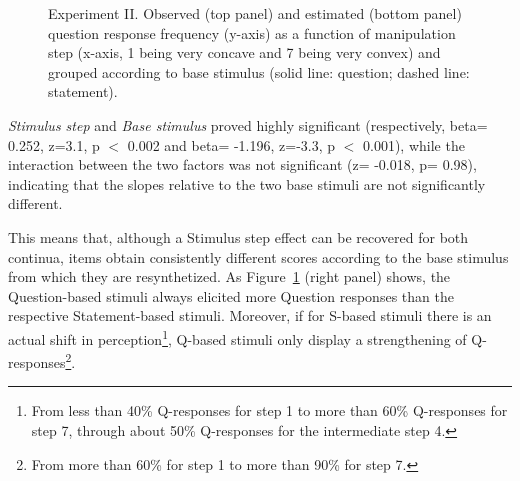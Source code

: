 \begin{figure}
\centering
{}
\caption{Experiment II. Observed (top panel) and estimated (bottom panel) question response frequency (y-axis) as a function of manipulation step (x-axis, 1 being very concave and 7 being very convex) and grouped according to base stimulus (solid line: question; dashed line: statement).}
\label{fig307}\end{figure}

\textit{Stimulus step} and \textit{Base stimulus} proved highly significant (respectively, beta= 0.252,  z=3.1, p $<$ 0.002 and beta= -1.196, z=-3.3, p $<$ 0.001), while the interaction between the two factors was not significant (z= -0.018, p= 0.98), indicating that the slopes relative to the two base stimuli are not significantly different. 

This means that, although a Stimulus step effect can be recovered for both continua, items obtain consistently different scores according to the base stimulus from which they are resynthetized. As Figure~\ref{fig307} (right panel) shows, the Question-based stimuli always elicited more Question responses than the respective Statement-based stimuli. Moreover, if for S-based stimuli there is an actual shift in perception\footnote{From less than 40\% Q-responses for step 1 to more than 60\% Q-responses for step 7, through about 50\% Q-responses for the intermediate step 4.}, Q-based stimuli only display a strengthening of Q-responses\footnote{From more than 60\% for step 1 to more than 90\% for step 7.}.

